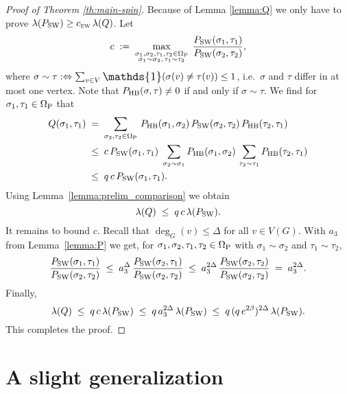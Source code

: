 \documentclass{dis}
\theoremstyle{citing}
\begin{document}
\begin{proof}[Proof of Theorem \ref{th:main-spin}]
Because of Lemma \ref{lemma:Q} we only have to prove 
$\lambda({P_{\rm SW}})\ge {c_{\text{\rm\tiny SW}}}\,\lambda(Q)$.
Let
\begin{equation}\label{eq:proof_main-spin}
c \;:=\; \max_{\substack{\sigma_1,\sigma_2,\tau_1,\tau_2\in{\Omega}_{\rm P}\\ 
\sigma_1\sim \sigma_2,\,\tau_1\sim \tau_2}}\;
\frac{{P_{\rm SW}}(\sigma_1,\tau_1)}{{P_{\rm SW}}(\sigma_2,\tau_2)},
\end{equation}
where $\sigma\sim\tau:\Leftrightarrow 
\sum_{v\in V}{\scalebox{1.2}{\raisebox{-0.2mm}{$\mathds{1}$}}}(\sigma(v)\neq\tau(v))\le1$, i.e.~$\sigma$ and $\tau$ 
differ in at most one vertex. 
Note that ${P_{\rm HB}}(\sigma,\tau)\neq0$ if and only if 
$\sigma\sim\tau$.
We find for $\sigma_1,\tau_1\in{{\Omega}_{\rm P}}$ that
\[\begin{split}
Q(\sigma_1,\tau_1) 
\;&=\; \sum_{\sigma_2,\tau_2\in{\Omega}_{\rm P}}\,
{P_{\rm HB}}(\sigma_1,\sigma_2)\,{P_{\rm SW}}(\sigma_2,\tau_2)\,
	{P_{\rm HB}}(\tau_2,\tau_1) \\
&\le\; c\,{P_{\rm SW}}(\sigma_1,\tau_1) \;\sum_{\sigma_2\sim\sigma_1} 
			{P_{\rm HB}}(\sigma_1,\sigma_2)\,
	\sum_{\tau_2\sim\tau_1} 
			{P_{\rm HB}}(\tau_2,\tau_1) \\
&\le\; q\,c\,{P_{\rm SW}}(\sigma_1,\tau_1).
\end{split}\]
Using Lemma~\ref{lemma:prelim_comparison} we obtain
\[
\lambda(Q) \;\le\; q\,c\,\lambda({P_{\rm SW}}).
\]
It remains to bound $c$. 
Recall that $\deg_G(v)\le{\Delta}$ for all $v\in V(G)$. 
With $a_3$ from Lemma~\ref{lemma:P} we get, for 
$\sigma_1,\sigma_2,\tau_1, \tau_2\in{{\Omega}_{\rm P}}$ with 
$\sigma_1\sim \sigma_2$ and $\tau_1\sim \tau_2$,
\[
\frac{{P_{\rm SW}}(\sigma_1,\tau_1)}{{P_{\rm SW}}(\sigma_2,\tau_2)}
\;\le\; a_3^{\Delta}\,\frac{{P_{\rm SW}}(\sigma_2,\tau_1)}{{P_{\rm SW}}(\sigma_2,\tau_2)}
\;\le\; a_3^{2 \Delta}\,\frac{{P_{\rm SW}}(\sigma_2,\tau_2)}{{P_{\rm SW}}(\sigma_2,\tau_2)} 
\;=\; a_3^{2 \Delta}.
\]
Finally,
\[
\lambda(Q) \;\le\; q\,c\,\lambda({P_{\rm SW}})
\;\le\; q\,a_3^{2 \Delta}\,\lambda({P_{\rm SW}})
\;\le\; q\,(q\,e^{2\beta})^{2 \Delta}\,\lambda({P_{\rm SW}}).
\]
This completes the proof.
\end{proof}

\section{A slight generalization} \label{sec:3_general}
\end{document}
